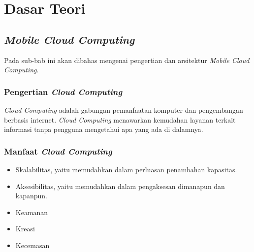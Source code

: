 \chapter{Dasar Teori}
\label{chap:dasarteori}

\section{\textit{Mobile Cloud Computing}}
\label{sec:mobilecloudcomputing}

Pada sub-bab ini akan dibahas mengenai pengertian dan arsitektur \textit{Mobile Cloud Computing}.

\subsection{Pengertian \textit{Cloud Computing}}
\label{subsec:pengertiancloud}
\hspace{0,5cm} \textit{Cloud Computing} adalah gabungan pemanfaatan komputer dan pengembangan berbasis internet. \textit{Cloud Computing} menawarkan kemudahan layanan terkait informasi tanpa pengguna mengetahui apa yang ada di dalamnya\cite{leymann2014cloud}.

\subsection{Manfaat \textit{Cloud Computing}}
\label{subsec:pengertianmanfaatcloud}
\begin{itemize}
	\item Skalabilitas, yaitu memudahkan dalam perluasan penambahan kapasitas.
	\item Aksesibilitas, yaitu memudahkan dalam pengaksesan dimanapun dan kapanpun.
	\item Keamanan
	\item Kreasi
	\item Kecemasan
\end{itemize}


